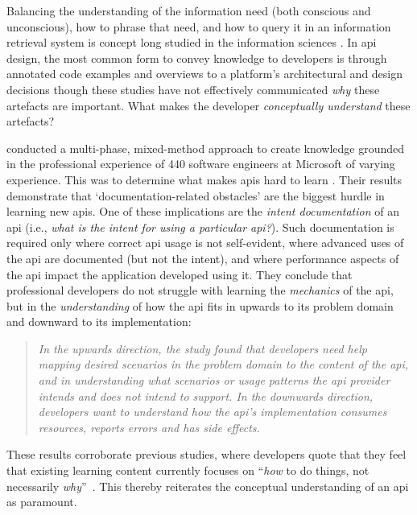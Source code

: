 Balancing the understanding of the information need (both conscious and unconscious), how to phrase that need, and how to query it in an information retrieval system is concept long studied in the information sciences \citep{Taylor:1968tq}. In \gls{api} design, the most common form to convey knowledge to developers is through annotated code examples and overviews to a platform's architectural and design decisions \citep{Myers:2011bt,Robillard:2011uv,Dorn:2010wl,Brandt:2009tm} though these studies have not effectively communicated \textit{why} these artefacts are important. What makes the developer \textit{conceptually understand} these artefacts?

\citet{Robillard:2011uv} conducted a multi-phase, mixed-method approach to create knowledge grounded in the professional experience of 440 software engineers at Microsoft of varying experience. This was to determine what makes \glspl{api} hard to learn \citep{Robillard:2009uk}. Their results demonstrate that `documentation-related obstacles' are the biggest hurdle in learning new \glspl{api}. One of these implications are the \textit{intent documentation} of an \gls{api} (i.e., \textit{what is the intent for using a particular \gls{api}?}). Such documentation is required only where correct \gls{api} usage is not self-evident, where advanced uses of the \gls{api} are documented (but not the intent), and where performance aspects of the \gls{api} impact the application developed using it. They conclude that professional developers do not struggle with learning the \textit{mechanics} of the \gls{api}, but in the \textit{understanding} of how the \gls{api} fits in upwards to its problem domain and downward to its implementation:
\begin{quote}
  \itshape
  In the \textup{upwards} direction, the study found that developers need help mapping desired scenarios in the problem domain to the content of the \gls{api}, and in understanding what scenarios or usage patterns the \gls{api} provider intends and does not intend to support. In the \textup{downwards} direction, developers want to understand how the \gls{api}'s implementation consumes resources, reports errors and has side effects. 
  \upshape
  \citep{Robillard:2011uv}
\end{quote}
These results corroborate previous studies, where developers quote that they feel that existing learning content currently focuses on ``\textit{how} to do things, not necessarily \textit{why}''~\citep{Nykaza:2002td}. This thereby reiterates the conceptual understanding of an \gls{api} as paramount.

